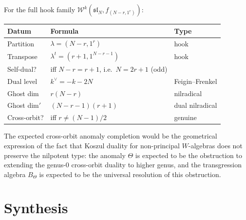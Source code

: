 \begin{remark}
For the full hook family
$\mathcal W^k(\mathfrak{sl}_N,f_{(N-r,1^r)})$:
\begin{center}
\renewcommand{\arraystretch}{1.2}
\begin{tabular}{lll}
\textbf{Datum} & \textbf{Formula} & \textbf{Type} \\
\hline
Partition & $\lambda=(N{-}r,1^r)$ & hook \\
Transpose & $\lambda^t=(r{+}1,1^{N{-}r{-}1})$ & hook \\
Self-dual? & iff $N{-}r=r{+}1$, i.e.\ $N=2r{+}1$ (odd) & \\
Dual level & $k^\vee=-k-2N$ & Feigin--Frenkel \\
Ghost dim & $r(N{-}r)$ & nilradical \\
Ghost dim$'$ & $(N{-}r{-}1)(r{+}1)$ & dual nilradical \\
Cross-orbit? & iff $r\neq(N{-}1)/2$ & genuine \\
\end{tabular}
\end{center}
The expected cross-orbit anomaly completion would be the geometrical
expression of the fact that Koszul duality for non-principal
$W$-algebras does not preserve the nilpotent type: the
anomaly $\Theta$ is expected to be the obstruction to extending the
genus-$0$ cross-orbit duality to higher genus, and the
transgression algebra $B_\Theta$ is expected to be the universal resolution
of this obstruction.
\end{remark}

\section{Synthesis}
\label{sec:acth-supplement}

